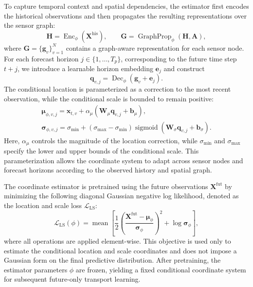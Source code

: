 \documentclass[sigconf, anonymous, review]{acmart}
\begin{document}
To capture temporal context and spatial dependencies, the estimator
first encodes the historical observations and then propagates the
resulting representations over the sensor graph:
%
\begin{equation}
\mathbf{H}
=
\operatorname{Enc}_{\phi}
\left(
\mathbf{X}^{\mathrm{his}}
\right),
\qquad
\mathbf{G}
=
\operatorname{GraphProp}_{\phi}
\left(
\mathbf{H},\mathbf{A}
\right),
\label{eq:coordinate_encoding}
\end{equation}
%
where $\mathbf{G}=\{\mathbf{g}_{v}\}_{v=1}^{N}$ contains a
graph-aware representation for each sensor node. For each forecast
horizon $j\in\{1,\ldots,T_p\}$, corresponding to the future time step
$t+j$, we introduce a learnable horizon embedding $\mathbf{e}_{j}$ and
construct
\begin{equation}
\mathbf{q}_{v,j}
=
\operatorname{Dec}_{\phi}
\left(
\mathbf{g}_{v}
+
\mathbf{e}_{j}
\right).
\label{eq:coordinate_horizon_representation}
\end{equation}
The conditional location is parameterized as a correction to the most
recent observation, while the conditional scale is bounded to remain
positive:
\begin{equation}
\begin{gathered}
\boldsymbol{\mu}_{\phi,v,j}
=
\mathbf{x}_{t,v}
+
\alpha_{\mu}
\left(
\mathbf{W}_{\mu}\mathbf{q}_{v,j}
+
\mathbf{b}_{\mu}
\right),
\\
\boldsymbol{\sigma}_{\phi,v,j}
=
\sigma_{\min}
+
\left(
\sigma_{\max}-\sigma_{\min}
\right)
\operatorname{sigmoid}
\left(
\mathbf{W}_{\sigma}\mathbf{q}_{v,j}
+
\mathbf{b}_{\sigma}
\right).
\end{gathered}
\label{eq:conditional_location_scale}
\end{equation}
Here, $\alpha_{\mu}$ controls the magnitude of the location correction,
while $\sigma_{\min}$ and $\sigma_{\max}$ specify the lower and upper
bounds of the conditional scale. This parameterization allows the
coordinate system to adapt across sensor nodes and forecast horizons
according to the observed history and spatial graph.

The coordinate estimator is pretrained using the future observations
$\mathbf{X}^{\mathrm{fut}}$ by minimizing the following diagonal
Gaussian negative log likelihood, denoted as the location and scale
loss $\mathcal{L}_{\mathrm{LS}}$:
%
\begin{equation}
\mathcal{L}_{\mathrm{LS}}(\phi)
=
\operatorname{mean}
\left[
\frac{1}{2}
\left(
\frac{
\mathbf{X}^{\mathrm{fut}}
-
\boldsymbol{\mu}_{\phi}
}{
\boldsymbol{\sigma}_{\phi}
}
\right)^{2}
+
\log
\boldsymbol{\sigma}_{\phi}
\right],
\label{eq:ls_loss}
\end{equation}
%
where all operations are applied element-wise. This objective is used
only to estimate the conditional location and scale coordinates and
does not impose a Gaussian form on the final predictive distribution.
After pretraining, the estimator parameters $\phi$ are frozen, yielding
a fixed conditional coordinate system for subsequent future-only
transport learning.
\end{document}
